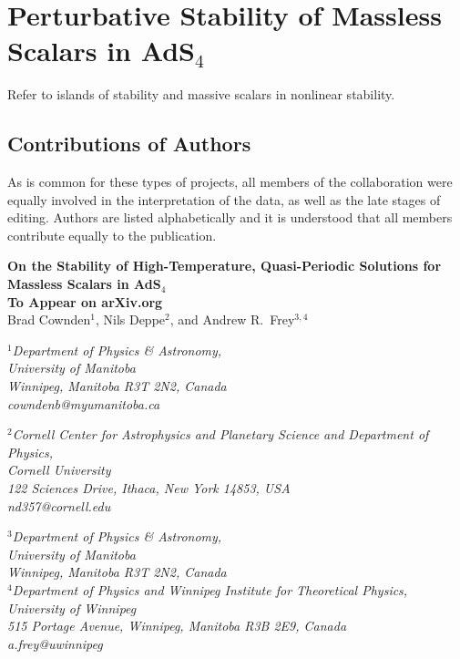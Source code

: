 \documentclass[../PhD.tex]{subfiles}
\begin{document}

\chapter{Perturbative Stability of Massless Scalars in AdS$_4$}

Refer to islands of stability and massive scalars in nonlinear stability.

\section{Contributions of Authors}

As is common for these types of projects, all members of the collaboration were equally involved in the interpretation of the data, as well as the late stages of editing. Authors are listed alphabetically and it is understood that all members contribute equally to the publication.

\newpage


\begin{center}
{\bf{\Large On the Stability of High-Temperature, Quasi-Periodic Solutions for Massless Scalars in AdS$_4$}} \\
\bigskip
{\bf To Appear on arXiv.org} \\
\bigskip
\bigskip
Brad Cownden$^1$, Nils Deppe$^2$, and Andrew R.~Frey$^{3,4}$\\
\bigskip

$^1${\it Department of Physics \& Astronomy,\\ University of Manitoba\\
Winnipeg, Manitoba R3T 2N2, Canada \\ {\rm cowndenb@myumanitoba.ca}} \\
\vspace{0.1in}

$^2${\it Cornell Center for Astrophysics and Planetary Science and
Department of Physics,\\ Cornell University\\
122 Sciences Drive, Ithaca, New York 14853, USA \\ {\rm nd357@cornell.edu}} \\
\vspace{0.1in}

$^3${\it Department of Physics \& Astronomy,\\ University of Manitoba\\
Winnipeg, Manitoba R3T 2N2, Canada} \\
$^4${\it Department of Physics and Winnipeg Institute for Theoretical
Physics,\\ University of Winnipeg\\
515 Portage Avenue, Winnipeg, Manitoba R3B 2E9, Canada \\ {\rm a.frey@uwinnipeg}}
\end{center}
\end{document}
